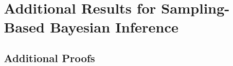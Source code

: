 
\chapter{Additional Results for Sampling-Based Bayesian Inference}

\label{app:gp_bnn}

\section{Additional Proofs}







